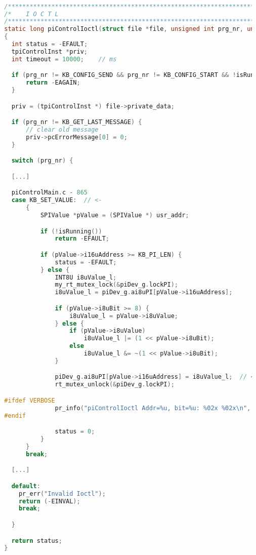 \begin{lstlisting}[language={c},firstnumber=718,caption={Methode piControlIoctl in piControlMain.c\label{lst:4-piControlIoctl}}]

  /*****************************************************************************/
  /*    I O C T L                                                           */
  /*****************************************************************************/
  static long piControlIoctl(struct file *file, unsigned int prg_nr, unsigned long usr_addr) // <-
  {
  	int status = -EFAULT;
  	tpiControlInst *priv;
  	int timeout = 10000;	// ms

  	if (prg_nr != KB_CONFIG_SEND && prg_nr != KB_CONFIG_START && !isRunning()) {
  		return -EAGAIN;
  	}

  	priv = (tpiControlInst *) file->private_data;

  	if (prg_nr != KB_GET_LAST_MESSAGE) {
  		// clear old message
  		priv->pcErrorMessage[0] = 0;
  	}

  	switch (prg_nr) {

    [...]

    piControlMain.c - 865
    case KB_SET_VALUE:	// <-
  		{
  			SPIValue *pValue = (SPIValue *) usr_addr;

  			if (!isRunning())
  				return -EFAULT;

  			if (pValue->i16uAddress >= KB_PI_LEN) {
  				status = -EFAULT;
  			} else {
  				INT8U i8uValue_l;
  				my_rt_mutex_lock(&piDev_g.lockPI);
  				i8uValue_l = piDev_g.ai8uPI[pValue->i16uAddress];

  				if (pValue->i8uBit >= 8) {
  					i8uValue_l = pValue->i8uValue;
  				} else {
  					if (pValue->i8uValue)
  						i8uValue_l |= (1 << pValue->i8uBit);
  					else
  						i8uValue_l &= ~(1 << pValue->i8uBit);
  				}

  				piDev_g.ai8uPI[pValue->i16uAddress] = i8uValue_l;  // <-
  				rt_mutex_unlock(&piDev_g.lockPI);

  #ifdef VERBOSE
  				pr_info("piControlIoctl Addr=%u, bit=%u: %02x %02x\n", pValue->i16uAddress, pValue->i8uBit, pValue->i8uValue, i8uValue_l);
  #endif

  				status = 0;
  			}
  		}
  		break;

    [...]

    default:
      pr_err("Invalid Ioctl");
      return (-EINVAL);
      break;

    }

    return status;
  }
\end{lstlisting}

